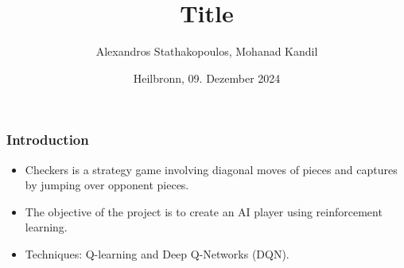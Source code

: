%
% 
% 
%





\renewcommand{\PersonTitel}{}
\newcommand{\Datum}{\today}

\renewcommand{\PraesentationFusszeileZusatz}{}

\title{Title}
\author{Alexandros Stathakopoulos, Mohanad Kandil}
\institute[]{\UniversitaetName}
\date[\Datum]{Heilbronn, 09. Dezember 2024}
\subject{}




\PraesentationMasterStandard

\PraesentationTitelseite %


\begin{frame}
	\frametitle{Introduction}
	\vspace{0.5cm}
	\begin{itemize}
		\item Checkers is a strategy game involving diagonal moves of pieces and captures by jumping over opponent pieces.
		\item The objective of the project is to create an AI player using reinforcement learning.
		\item Techniques: Q-learning and Deep Q-Networks (DQN).
	\end{itemize}
\end{frame}


